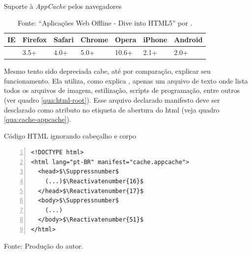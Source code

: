 
\begin{table}[h]
\centering
  \caption{Suporte à \textit{AppCache} pelos navegadores}\label{tab:appcache-compatibility}
\begin{tabular}{ C{46pt} | C{46pt} | C{46pt} | C{46pt} | C{46pt} | C{46pt} | C{46pt} }\hline
IE & Firefox & Safari & Chrome & Opera & iPhone & Android \\ \hline
 & 3.5+ & 4.0+ & 5.0+ & 10.6+ & 2.1+ & 2.0+ \\ \hline
\end{tabular}
  \caption*{\ifdraft{\color{green}}{}\footnotesize Fonte: ``Aplicações Web Offline - Dive into HTML5'' por .}
\end{table}

Mesmo tento sido depreciada cabe, até por comparação, explicar seu funcionamento. Ela utiliza, como explica , apenas um arquivo de texto onde lista todos os arquivos de imagem, estilização, scripts de programação, entre outros (ver quadro \ref{qua:html-root}). Esse arquivo declarado manifesto deve ser desclarado como atributo no etiqueta de abertura do html (veja quadro  \ref{qua:cache-appcache}).

\let\origthelstnumber\thelstnumber
\makeatletter
\newcommand*\Suppressnumber{%
  \lst@AddToHook{OnNewLine}{%
    \let\thelstnumber\relax%
     \advance\c@lstnumber-\@ne\relax%
    }%
}

\newcommand*\Reactivatenumber[1]{%
  \lst@AddToHook{OnNewLine}{%
   \let\thelstnumber\origthelstnumber%
   \setcounter{lstnumber}{\numexpr#1-1\relax}%
  }%
}

\makeatother

\begin{quadro}[h]
\centering
  \caption{Código HTML ignorando cabeçalho e corpo}\label{qua:html-root}
\begin{lstlisting}[numbers=left,escapeinside=\$\$,frame=single]
<!DOCTYPE html>
<html lang="pt-BR" manifest="cache.appcache">
  <head>$\Suppressnumber$
    (...)$\Reactivatenumber{16}$
  </head>$\Reactivatenumber{17}$
  <body>$\Suppressnumber$
    (...)
  </body>$\Reactivatenumber{51}$
</html>

\end{lstlisting}
  \caption*{\ifdraft{\color{green}}{}\footnotesize Fonte: Produção do autor.}
\end{quadro}

